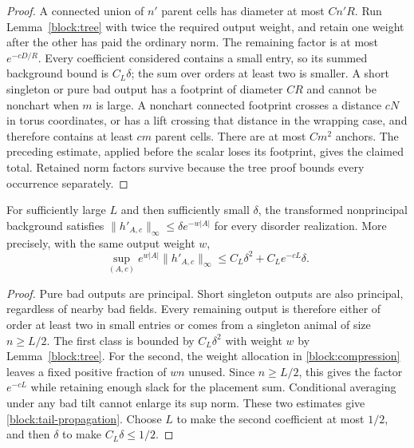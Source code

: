 \begin{proof}
A connected union of $n'$ parent cells has diameter at most $Cn'R$.
Run Lemma~\ref{block:tree} with twice the required output weight, and
retain one weight after the other has paid the ordinary norm.  The
remaining factor is at most $e^{-cD/R}$.  Every coefficient considered
contains a small entry, so its summed background bound is $C_L\delta$;
the sum over orders at least two is smaller.  A short singleton or pure
bad output has a footprint of diameter $CR$ and cannot be nonchart
when $m$ is large.  A nonchart connected footprint crosses a distance
$cN$ in torus coordinates, or has a lift crossing that distance in the
wrapping case, and therefore contains at least $cm$ parent cells.
There are at most $Cm^2$ anchors.  The preceding estimate, applied
before the scalar loses its footprint, gives the claimed total.
Retained norm factors survive because the tree proof bounds every
occurrence separately.
\end{proof}

\begin{corollary}
\label{block:tails}
For sufficiently large $L$ and then sufficiently small $\delta$, the
transformed nonprincipal background satisfies
$\|h'_{A,c}\|_\infty\le\delta e^{-w|A|}$ for every disorder realization.
More precisely, with the same output weight $w$,
\begin{equation}
 \sup_{(A,c)}e^{w|A|}\|h'_{A,c}\|_\infty
       \le C_L\delta^2+C_Le^{-cL}\delta.
 \label{block:tail-propagation}
\end{equation}
\end{corollary}

\begin{proof}
Pure bad outputs are principal.  Short singleton outputs are also
principal, regardless of nearby bad fields.  Every remaining output
is therefore either of order at least two in small entries or comes
from a singleton animal of size $n\ge L/2$.  The first class is bounded
by $C_L\delta^2$ with weight $w$ by Lemma~\ref{block:tree}.
For the second, the weight allocation in
\eqref{block:compression} leaves a fixed positive fraction of $wn$
unused.  Since $n\ge L/2$, this gives the factor $e^{-cL}$ while
retaining enough slack for the placement sum.  Conditional averaging
under any bad tilt cannot enlarge its sup norm.  These two estimates
give \eqref{block:tail-propagation}.  Choose $L$ to make the second
coefficient at most $1/2$, and then $\delta$ to make
$C_L\delta\le1/2$.
\end{proof}


